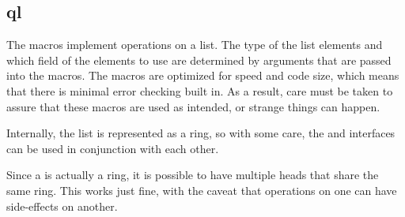 %
%
%
%
%

\subsection{ql}
\label{ql}

The  macros implement operations on a list.  The type of the list
elements and which field of the elements to use are determined by arguments that
are passed into the macros.  The macros are optimized for speed and code size,
which means that there is minimal error checking built in.  As a result, care
must be taken to assure that these macros are used as intended, or strange
things can happen.

Internally, the list is represented as a ring, so with some care, the
 and  interfaces can be used in conjunction with
each other.

Since a  is actually a ring, it is possible to have multiple
 heads that share the same ring.  This works just fine, with the
caveat that operations on one  can have side-effects on another.

